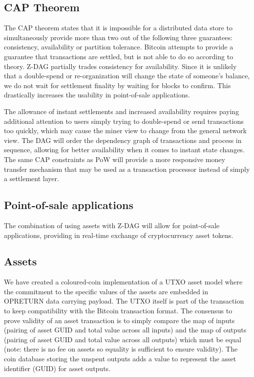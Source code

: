 \documentclass[peerreview]{ieeesyscoin}
\begin{document}
\subsection{CAP Theorem}
The CAP theorem \cite{Bre12} states that it is impossible for a distributed data store to simultaneously provide more than two out of the following three guarantees: consistency, availability or partition tolerance. Bitcoin attempts to provide a guarantee that transactions are settled, but is not able to do so according to theory. Z-DAG partially trades consistency for availability. Since it is unlikely that a double-spend or re-organization will change the state of someone’s balance, we do not wait for settlement finality by waiting for blocks to confirm. This drastically increases the usability in point-of-sale applications.

The allowance of instant settlements and increased availability requires paying additional attention to users simply trying to double-spend or send transactions too quickly, which may cause the miner view to change from the general network view. The DAG will order the dependency graph of transactions and process in sequence, allowing for better availability when it comes to instant state changes. The same CAP constraints as PoW will provide a more responsive money transfer mechanism that may be used as a transaction processor instead of simply a settlement layer.

\subsection{Point-of-sale applications}
The combination of using assets with Z-DAG will allow for point-of-sale applications, providing in real-time exchange of cryptocurrency asset tokens.

\subsection{Assets}
We have created a coloured-coin implementation of a UTXO asset model where the commitment to the specific values of the assets are embedded in OPRETURN data carrying payload. The UTXO itself is part of the transaction to keep compatibility with the Bitcoin transaction format. The consensus to prove validity of an asset transaction is to simply compare the map of inputs (pairing of asset GUID and total value across all inputs) and the map of outputs (pairing of asset GUID and total value across all outputs) which must be equal (note: there is no fee on assets so equality is sufficient to ensure validity). The coin database storing the unspent outputs adds a value to represent the asset identifier (GUID) for asset outputs.
\end{document}

